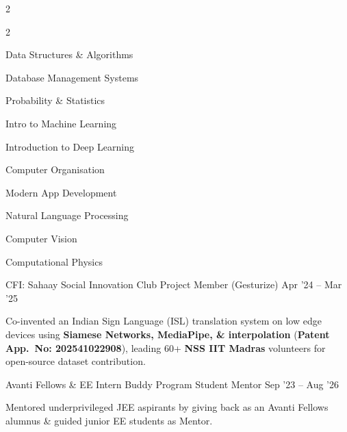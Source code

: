 \documentclass{resume}
\begin{document}
\begin{paracol}{2}
\setlength{\multicolsep}{0pt}
\begin{multicols}{2}
\begin{resumeItemize}
\item Data Structures \& Algorithms
\item Database Management Systems
\item Probability \& Statistics
\item Intro to Machine Learning
\item Introduction to Deep Learning
\item Computer Organisation
\item Modern App Development
\item Natural Language Processing
\item Computer Vision
\item Computational Physics
\end{resumeItemize}
\end{multicols}


\resumeExperience
{CFI: Sahaay Social Innovation Club}
{\textcolor{subheadingblue}{Project Member (Gesturize)}}
{Apr '24 -- Mar '25}
{
\begin{resumeItemize}
\item Co-invented an Indian Sign Language (ISL) translation system on low edge devices using \textbf{Siamese Networks, MediaPipe, \& interpolation} (\textbf{Patent App.~No: 202541022908}), leading 60+ \textbf{NSS IIT Madras} volunteers for open-source dataset contribution.
\end{resumeItemize}
}


\resumeExperience
{Avanti Fellows \& EE Intern Buddy Program}
{\textcolor{subheadingblue}{Student Mentor}}
{Sep '23 -- Aug '26}
{
\begin{resumeItemize}
\item Mentored underprivileged JEE aspirants by giving back as an Avanti Fellows alumnus \& guided junior EE students as Mentor.
\end{resumeItemize}
}


\switchcolumn




\end{paracol}
\end{document}
